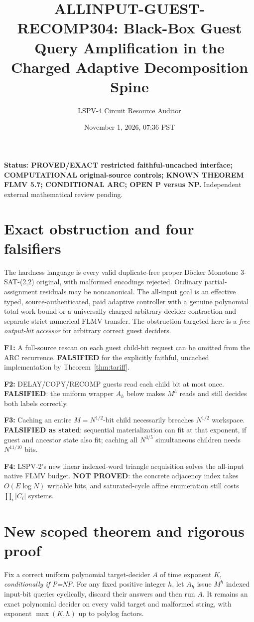 \documentclass[11pt]{article}
\title{ALLINPUT-GUEST-RECOMP304: Black-Box Guest Query Amplification in the Charged Adaptive Decomposition Spine}
\author{LSPV-4 Circuit Resource Auditor}
\date{November 1, 2026, 07:36 PST}
\begin{document}
\maketitle
\noindent\textbf{Status: PROVED/EXACT restricted faithful-uncached interface; COMPUTATIONAL original-source controls; KNOWN THEOREM FLMV 5.7; CONDITIONAL ARC; OPEN P versus NP.} Independent external mathematical review pending.
\section{Exact obstruction and four falsifiers}
The hardness language is every valid duplicate-free proper D\"ocker Monotone 3-SAT-(2,2) original, with malformed encodings rejected. Ordinary partial-assignment residuals may be noncanonical. The all-input goal is an effective typed, source-authenticated, paid adaptive controller with a genuine polynomial total-work bound or a universally charged arbitrary-decider contraction and separate strict numerical FLMV transfer. The obstruction targeted here is a \emph{free output-bit accessor} for arbitrary correct guest deciders.

\noindent\textbf{F1:} A full-source rescan on each guest child-bit request can be omitted from the ARC recurrence. \textbf{FALSIFIED} for the explicitly faithful, uncached implementation by Theorem~\ref{thm:tariff}. \par
\noindent\textbf{F2:} DELAY/COPY/RECOMP guests read each child bit at most once. \textbf{FALSIFIED}: the uniform wrapper $A_h$ below makes $M^h$ reads and still decides both labels correctly. \par
\noindent\textbf{F3:} Caching an entire $M=N^{1/2}$-bit child necessarily breaches $N^{1/2}$ workspace. \textbf{FALSIFIED as stated}: sequential materialization can fit at that exponent, if guest and ancestor state also fit; caching all $N^{3/5}$ simultaneous children needs $N^{11/10}$ bits. \par
\noindent\textbf{F4:} LSPV-2's new linear indexed-word triangle acquisition solves the all-input native FLMV budget. \textbf{NOT PROVED}: the concrete adjacency index takes $O(E\log N)$ writable bits, and saturated-cycle affine enumeration still costs $\prod_i |C_i|$ systems.

\section{New scoped theorem and rigorous proof}
Fix a correct uniform polynomial target-decider $A$ of time exponent $K$, \emph{conditionally if P=NP}. For any fixed positive integer $h$, let $A_h$ issue $M^h$ indexed input-bit queries cyclically, discard their answers and then run $A$. It remains an exact polynomial decider on every valid target and malformed string, with exponent $\max(K,h)$ up to polylog factors.
\end{document}
